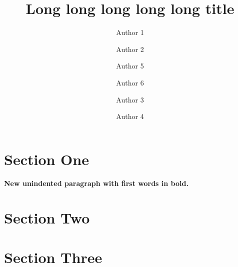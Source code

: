 \documentclass[
    11pt,       %
    BCOR=5mm,   %
    DIV=14      %
    ]{scrartcl}
\title{Long long long long long title}
\author[1]{Author 1}
\author[2]{Author 2}
\author[1]{Author 5}
\author[2]{Author 6}
\author[1]{Author 3}
\author[1]{Author 4}
\affil[1]{Affiliation 1}
\affil[2]{Affiliation 2}
\date{} %
\begin{document}

\maketitle

\section{Section One}

\Blindtext

\paragraph{New unindented paragraph with first words in bold.}\blindtext

\section{Section Two}

\Blindtext

\section{Section Three}

\Blindtext


%
\end{document}

